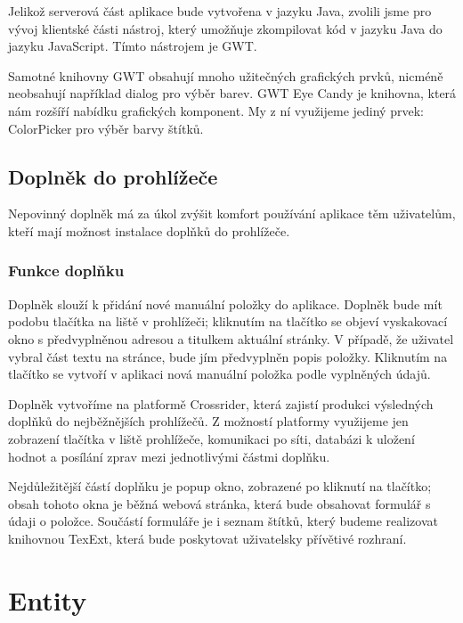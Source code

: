 Jelikož serverová část aplikace bude vytvořena v jazyku Java, zvolili jsme pro vývoj klientské části nástroj, který umožňuje zkompilovat kód v jazyku Java do jazyku JavaScript.
Tímto nástrojem je GWT.

Samotné knihovny GWT obsahují mnoho užitečných grafických prvků, nic\-mé\-ně neobsahují například dialog pro výběr barev.
GWT Eye Candy je knihovna, která nám rozšíří nabídku grafických komponent. %
My z ní využijeme jediný prvek: ColorPicker pro výběr barvy štítků.

\subsection{Doplněk do prohlížeče}

Nepovinný doplněk má za úkol zvýšit komfort používání aplikace těm uživatelům, kteří mají možnost instalace doplňků do prohlížeče.

\subsubsection{Funkce doplňku}

Doplněk slouží k přidání nové manuální položky do aplikace.
Doplněk bude mít podobu tlačítka na liště v prohlížeči; kliknutím na tlačítko se objeví vyskakovací okno s předvyplněnou adresou a titulkem aktuální stránky.
V případě, že uživatel vybral část textu na stránce, bude jím předvyplněn popis položky.
Kliknutím na tlačítko  se vytvoří v aplikaci nová manuální položka podle vyplněných údajů.

\bigskip

Doplněk vytvoříme na platformě Crossrider, která zajistí produkci výsledných doplňků do nejběžnějších prohlížečů.
Z možností platformy využijeme jen zobrazení tlačítka v liště prohlížeče, komunikaci po síti, databázi k uložení hodnot a posílání zprav mezi jednotlivými částmi doplňku.

Nejdůležitější částí doplňku je popup okno, zobrazené po kliknutí na tlačítko; obsah tohoto okna je běžná webová stránka, která bude obsahovat formulář s údaji o položce.
Součástí formuláře je i seznam štítků, který budeme realizovat knihovnou TexExt, která bude poskytovat uživatelsky přívětivé rozhraní.

\section{Entity}

